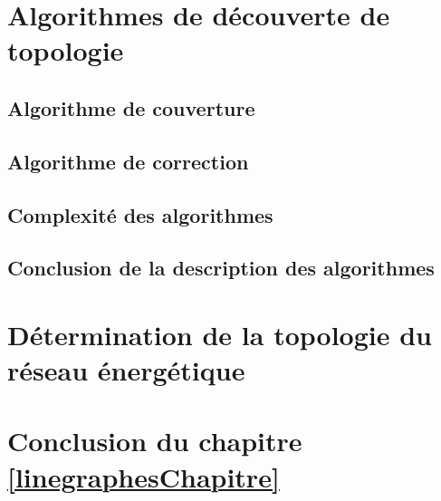 \documentclass[onecolumn, 12pt]{book}
\begin{document}
\section{Algorithmes de d\'ecouverte de topologie}

	
	
	\subsection{Algorithme de couverture}
		\label{algoCouverture}
		
	\subsection{Algorithme de correction}
		

	\subsection{Complexit\'e des algorithmes}
		

	\subsection{Conclusion de la description des algorithmes}
		

\section{D\'etermination de la topologie du r\'eseau \'energ\'etique}
	
		
\section{Conclusion du chapitre \ref{linegraphesChapitre} }
	 
\end{document}
